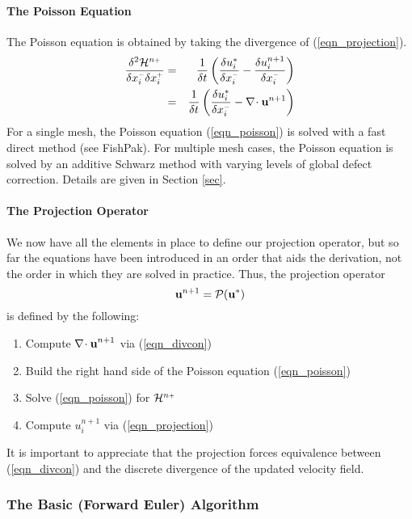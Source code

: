 \documentclass[11pt]{article}
\begin{document}
\paragraph{The Poisson Equation}

The Poisson equation is obtained by taking the divergence of (\ref{eqn_projection}).
\begin{eqnarray}
\label{eqn_poisson}
\frac{\delta^2 {\cal H}^{n{\scriptscriptstyle +}}}{\delta x_i^{\scriptscriptstyle -}\delta x_i^{\scriptscriptstyle +}} &=& \frac{1}{\delta t}\left( \frac{\delta u_i^*}{\delta x_i^{\scriptscriptstyle -}} - \frac{\delta u_i^{n+1}}{\delta x_i^{\scriptscriptstyle -}} \right) \nonumber\\
&=& \frac{1}{\delta t}\left( \frac{\delta u_i^*}{\delta x_i^{\scriptscriptstyle -}} - \nabla\!\cdot \mathbf{u}^{n+1} \right)
\end{eqnarray}
For a single mesh, the Poisson equation (\ref{eqn_poisson}) is solved with a fast direct method (see FishPak).  For multiple mesh cases, the Poisson equation is solved by an additive Schwarz method with varying levels of global defect correction.  Details are given in Section \ref{sec}.

\paragraph{The Projection Operator} We now have all the elements in place to define our projection operator, but so far the equations have been introduced in an order that aids the derivation, not the order in which they are solved in practice.  Thus, the projection operator
\begin{equation}
\mathbf{u}^{n+1} = {\cal P}(\mathbf{u}^*)
\end{equation}
is defined by the following:
\begin{enumerate}
\item Compute ${\nabla\!\cdot \mathbf{u}}^{n+1}$ via (\ref{eqn_divcon})
\item Build the right hand side of the Poisson equation (\ref{eqn_poisson})
\item Solve (\ref{eqn_poisson}) for ${\cal H}^{n{\scriptscriptstyle +}}$
\item Compute $u_i^{n+1}$ via (\ref{eqn_projection})
\end{enumerate}
It is important to appreciate that the projection forces equivalence between (\ref{eqn_divcon}) and the discrete divergence of the updated velocity field.


\subsubsection{The Basic (Forward Euler) Algorithm}
\end{document}
